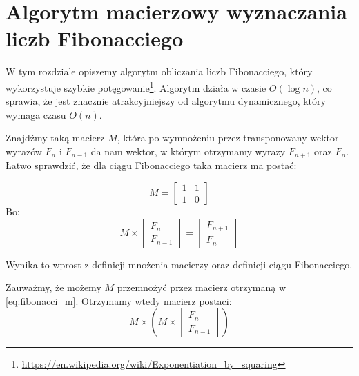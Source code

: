 \section{Algorytm macierzowy wyznaczania liczb Fibonacciego}

W tym rozdziale opiszemy algorytm obliczania liczb Fibonacciego, który wykorzystuje szybkie potęgowanie\footnote{\url{https://en.wikipedia.org/wiki/Exponentiation_by_squaring}}.
Algorytm działa w czasie $O(\log{n})$, co sprawia, że jest znacznie atrakcyjniejszy od algorytmu dynamicznego, który wymaga czasu $O(n)$.

Znajdźmy taką macierz $M$, która po wymnożeniu przez transponowany wektor wyrazów 
$F_{n}$ i $F_{n - 1}$ da nam wektor, w którym otrzymamy wyrazy $F_{n + 1}$ oraz $F_{n}$. 
Łatwo sprawdzić, że dla ciągu Fibonacciego taka macierz ma postać:

\begin{equation*}
	M = \begin{bmatrix}1 & 1\\1 & 0\end{bmatrix}
\end{equation*}
Bo:
\begin{equation}
\label{eq:fibonacci_m}
	M \times
	\begin{bmatrix}F_n \\ F_{n - 1}\end{bmatrix}
	= \begin{bmatrix}F_{n + 1} \\ F_{n}\end{bmatrix}
\end{equation}

Wynika to wprost z definicji mnożenia macierzy oraz definicji ciągu Fibonacciego.

\begin{observation}{Zauważmy, że możemy $M$ przemnożyć przez macierz otrzymaną w \ref{eq:fibonacci_m}. Otrzymamy wtedy macierz postaci:}
\begin{equation}
	M \times \left(M \times \begin{bmatrix}F_n \\ F_{n - 1}\end{bmatrix}\right)
\end{equation}
\end{observation}


